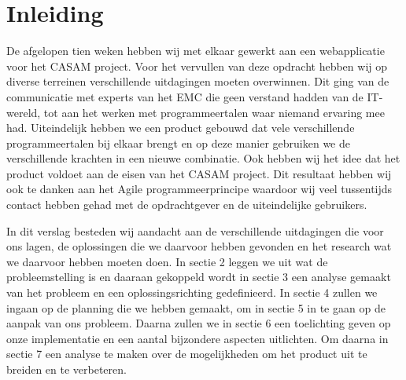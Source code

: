 \section{Inleiding}
\label{inleiding}
De afgelopen tien weken hebben wij met elkaar gewerkt aan een webapplicatie voor het CASAM project. Voor het vervullen van deze opdracht hebben wij op diverse terreinen verschillende uitdagingen moeten overwinnen. Dit ging van de communicatie met experts van het EMC die geen verstand hadden van de IT-wereld, tot aan het werken met programmeertalen waar niemand ervaring mee had. 
Uiteindelijk hebben we een product gebouwd dat vele verschillende programmeertalen bij elkaar brengt en op deze manier gebruiken we de verschillende krachten in een nieuwe combinatie. Ook hebben wij het idee dat het product voldoet aan de eisen van het CASAM project. Dit resultaat hebben wij ook te danken aan het Agile programmeerprincipe waardoor wij veel tussentijds contact hebben gehad met de opdrachtgever en de uiteindelijke gebruikers.

In dit verslag besteden wij aandacht aan de verschillende uitdagingen die voor ons lagen, de oplossingen die we daarvoor hebben gevonden en het research wat we daarvoor hebben moeten doen. In sectie 2 leggen we uit wat de probleemstelling is en daaraan gekoppeld wordt in sectie 3 een analyse gemaakt van het probleem en een oplossingsrichting gedefinieerd. In sectie 4 zullen we ingaan op de planning die we hebben gemaakt, om in sectie 5 in te gaan op de aanpak van ons probleem. Daarna zullen we in sectie 6 een toelichting geven op onze implementatie en een aantal bijzondere aspecten uitlichten. Om daarna in sectie 7 een analyse te maken over de mogelijkheden om het product uit te breiden en te verbeteren. 

